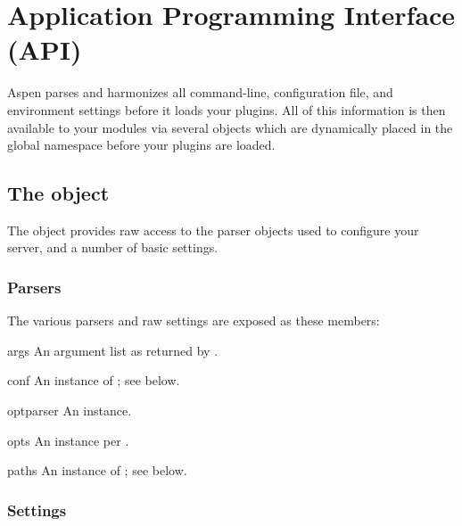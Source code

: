 \chapter{Application Programming Interface (API) \label{api}}

Aspen parses and harmonizes all command-line, configuration file, and
environment settings before it loads your plugins. All of this information is
then available to your modules via several objects which are dynamically placed
in the global  namespace before your plugins are loaded.


\section{The  object}
\label{api-configuration}

The  object provides raw access to the parser objects
used to configure your server, and a number of basic settings.

\subsection{Parsers}

The various parsers and raw settings are exposed as these members:

\begin{memberdesc}[list]{args}
An argument list as returned by .
\end{memberdesc}

\begin{memberdesc}[ConfFile]{conf}
An instance of ; see below.
\end{memberdesc}

\begin{memberdesc}[OptionParser]{optparser}
An  instance.
\end{memberdesc}

\begin{memberdesc}[Values]{opts}
An  instance per .
\end{memberdesc}

\begin{memberdesc}[Paths]{paths}
An instance of ; see below.
\end{memberdesc}


\subsection{Settings}


